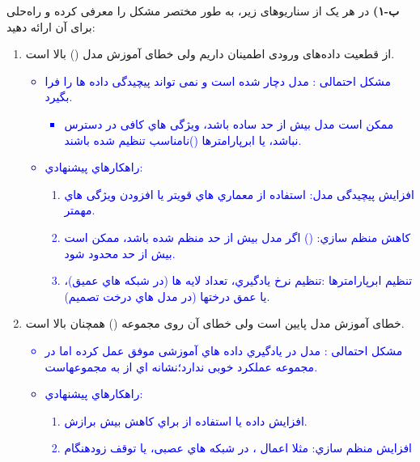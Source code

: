 \documentclass[12pt]{article}
\begin{document}
\begin{enumerate}
    \textbf{ب-۱)}
    در هر یک از سناریوهای زیر، به طور مختصر مشکل را معرفی کرده و راه‌حلی برای آن ارائه دهید:
    \begin{enumerate}
        \item از قطعیت داده‌های ورودی اطمینان داریم ولی خطای آموزش مدل () بالا است.\\
        \textcolor{blue}{
        \begin{itemize}
            \item مشکل احتمالی : مدل دچار  شده است و نمی تواند پیچیدگی داده ها را فرا بگیرد.
            \begin{itemize}
                \item ممکن است مدل بیش از حد ساده باشد، ویژگی هاي کافی در دسترس نباشد، یا ابرپارامترها
                ()نامناسب تنظیم شده باشند. 
            \end{itemize}
            \item راهکارهاي پیشنهادي:\\
            \begin{enumerate}
                \item افزایش پیچیدگی مدل: استفاده از معماري هاي قويتر یا افزودن ویژگی هاي مهمتر.
                \item کاهش منظم سازي: () اگر مدل بیش از حد منظم شده باشد، ممکن است بیش
                از حد محدود شود.
                \item تنظیم ابرپارامترها :تنظیم نرخ یادگیري، تعداد لایه ها (در شبکه هاي عمیق)، یا عمق درختها (در
                مدل هاي درخت تصمیم).
            \end{enumerate}
        \end{itemize}
        }
        \item خطای آموزش مدل پایین است ولی خطای آن روی مجموعه () همچنان بالا است.\\
        \textcolor{blue}{
        \begin{itemize}
            \item مشکل احتمالی : مدل در یادگیري داده هاي آموزشی موفق عمل کرده اما در مجموعه  عملکرد خوبی
            ندارد؛نشانه اي از به مجموعهاست. 
            \item راهکارهاي پیشنهادي:\\
            \begin{enumerate}
                \item افزایش داده یا استفاده از  براي کاهش بیش برازش.
                \item افزایش منظم سازي: مثلا اعمال  ، در شبکه هاي عصبی، یا توقف زودهنگام 
\end{enumerate}
\end{itemize}}
\end{enumerate}
\end{enumerate}
\end{document}
